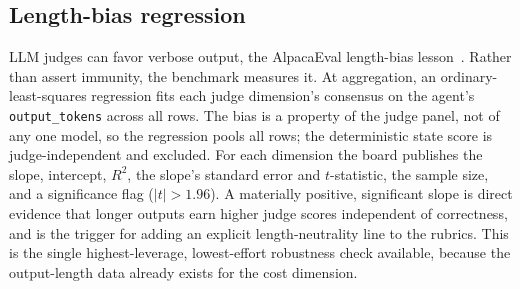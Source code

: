 \subsection{Length-bias regression}

LLM judges can favor verbose output, the AlpacaEval length-bias
lesson~\cite{lengthcontrolled2024}. Rather than assert immunity, the benchmark
measures it. At aggregation, an ordinary-least-squares regression fits each judge
dimension's consensus on the agent's \texttt{output\_tokens} across all rows. The
bias is a property of the judge panel, not of any one model, so the regression
pools all rows; the deterministic state score is judge-independent and excluded.
For each dimension the board publishes the slope, intercept, $R^2$, the slope's
standard error and $t$-statistic, the sample size, and a significance flag
($|t| > 1.96$). A materially positive, significant slope is direct evidence that
longer outputs earn higher judge scores independent of correctness, and is the
trigger for adding an explicit length-neutrality line to the rubrics. This is the
single highest-leverage, lowest-effort robustness check available, because the
output-length data already exists for the cost dimension.

